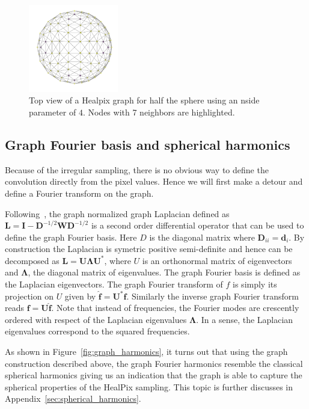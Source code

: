\documentclass[final,twocolumn,3p,times,authoryear]{elsarticle}
\newcommand{\todo}[1]{{\color[rgb]{.6,.1,.6}{#1}}}
\newcommand{\figref}[1]{Figure~\ref{fig:#1}}
\renewcommand{\b}[1]{{\bm{#1}}}   %
\newcommand{\1}{\b{1}}              %
\newcommand{\0}{\b{0}}              %
\renewcommand{\L}{\b{L}} %
\newcommand{\W}{\b{W}}
\newcommand{\I}{\b{I}}
\newcommand{\D}{\b{D}}
\newcommand{\U}{\b{U}}
\newcommand{\bLambda}{\b{\Lambda}}
\begin{document}
\begin{figure}[!ht]
\centering
\vspace{-0.5cm}
\includegraphics[width=0.35\textwidth]{figures/half_graph_4.pdf}
\vspace{-0.5cm}
\caption{
Top view of a Healpix graph for half the sphere using an nside parameter of $4$.
Nodes with 7 neighbors are highlighted. \label{fig:healpix_graph_4}
}

\end{figure}

\subsection{Graph Fourier basis and spherical harmonics}
\todo{Add a few extra references}

Because of the irregular sampling, there is no obvious way to define the convolution
directly from the pixel values. Hence we will first make a detour and define a Fourier transform on the
graph.

Following~\cite{shuman2013emerging}, the graph normalized graph Laplacian
defined as $\L = \I - \D^{-1/2} \W \D^{-1/2}$ is a second order differential operator
that can be used to define the graph Fourier basis. Here $D$ is the diagonal
matrix where $\D_{ii}=\b{d}_i$. By construction the Laplacian is symetric positive
semi-definite and hence can be decomposed as $\L=\U \bLambda \U^*$, where $U$ is an
orthonormal matrix of eigenvectors and $\bLambda$, the diagonal matrix of
eigenvalues. The graph Fourier basis is defined as the Laplacian eigenvectors.
The graph Fourier transform of $f$ is simply its projection on $U$ given by
$\hat{\b{f}}=\U^*\b{f}$. Similarly the inverse graph Fourier transform reads $\b{f}=\U\hat{\b{f}}$.
Note that instead of frequencies, the Fourier modes are crescently ordered with
respect of the Laplacian eigenvalues $\bLambda$. In a sense, the Laplacian
eigenvalues correspond to the squared frequencies.

As shown in \figref{graph_harmonics}, it turns out that using the graph
construction described above, the graph Fourier harmonics resemble the
classical spherical harmonics giving us an indication that the graph is able to
capture the spherical properties of the HealPix sampling. This topic is further discusses in Appendix~\ref{sec:spherical_harmonics}.
\end{document}
